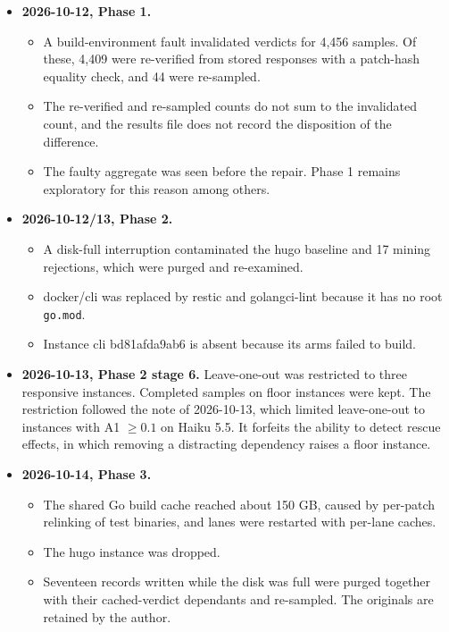\begin{itemize}
\item \textbf{2026-10-12, Phase 1.}
  \begin{itemize}
  \item A build-environment fault invalidated verdicts for 4,456 samples. Of these, 4,409 were re-verified from stored responses with a patch-hash equality check, and 44 were re-sampled.
  \item The re-verified and re-sampled counts do not sum to the invalidated count, and the results file does not record the disposition of the difference.
  \item The faulty aggregate was seen before the repair. Phase 1 remains exploratory for this reason among others.
  \end{itemize}
\item \textbf{2026-10-12/13, Phase 2.}
  \begin{itemize}
  \item A disk-full interruption contaminated the hugo baseline and 17 mining rejections, which were purged and re-examined.
  \item docker/cli was replaced by restic and golangci-lint because it has no root \texttt{go.mod}.
  \item Instance cli bd81afda9ab6 is absent because its arms failed to build.
  \end{itemize}
\item \textbf{2026-10-13, Phase 2 stage 6.} Leave-one-out was restricted to three responsive instances. Completed samples on floor instances were kept. The restriction followed the note of 2026-10-13, which limited leave-one-out to instances with A1 $\geq 0.1$ on Haiku 5.5. It forfeits the ability to detect rescue effects, in which removing a distracting dependency raises a floor instance.
\item \textbf{2026-10-14, Phase 3.}
  \begin{itemize}
  \item The shared Go build cache reached about 150 GB, caused by per-patch relinking of test binaries, and lanes were restarted with per-lane caches.
  \item The hugo instance was dropped.
  \item Seventeen records written while the disk was full were purged together with their cached-verdict dependants and re-sampled. The originals are retained by the author.
  \end{itemize}
\end{itemize}

